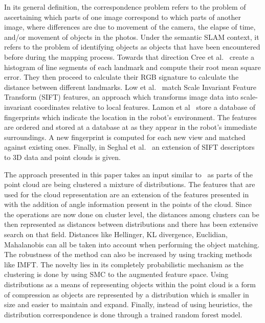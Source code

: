 \documentclass[twoside,hidelinks]{article}
\begin{document}
In its general definition, the correspondence problem refers to the problem of ascertaining which parts of one image correspond to which parts of another image, where differences are due to movement of the camera, the elapse of time, and/or movement of objects in the photos. Under the semantic SLAM context, it refers to the problem of identifying objects as objects that have been encountered before during the mapping process. Towards that direction Cree et al.~\cite{corresp:first} create a histogram of line segments of each landmark and compute their root mean square error. They then proceed to calculate their RGB signature to calculate the distance between different landmarks. Low et al.~\cite{corres:sec} match Scale Invariant Feature Transform (SIFT) features, an approach which transforms image data into scale-invariant coordinates relative to local features. Lamon et al~\cite{corres:three} store a database of fingerprints which indicate the location in the robot's environment. The features are ordered and stored at a database at as they appear in the robot's immediate surroundings. A new fingerprint is computed for each new view and matched against existing ones. Finally, in Seghal et al.~\cite{corres:four} an extension of SIFT descriptors to 3D data and point clouds is given.

The approach presented in this paper takes an input similar to~\cite{objectDisc} as parts of the point cloud are being clustered a mixture of distributions. The features that are used for the cloud representation are an extension of the features presented in~\cite{smcddp} with the addition of angle information present in the points of the cloud. Since the operations are now done on cluster level, the distances among clusters can be then represented as distances between distributions and there has been extensive search on that field. Distances like Hellinger, KL divergence, Euclidian, Mahalanobis can all be taken into account when performing the object matching. The robustness of the method can also be increased by using tracking methods like IMFT. The novelty lies in its completely probabilistic mechanism as the clustering is done by using SMC to the augmented feature space. Using distributions as a means of representing objects within the point cloud is a form of compression as objects are represented by a distribution which is smaller in size and easier to maintain and expand. Finally, instead of using heuristics, the distribution correspondence is done through a trained random forest model.
  
\end{document}
